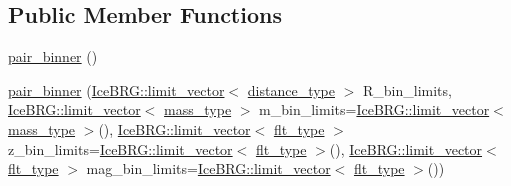 \subsection*{Public Member Functions}
\begin{DoxyCompactItemize}
\item 
\hyperlink{classIceBRG_1_1pair__binner_a14fe5215ad45872e549c71ecc4e170e9}{pair\+\_\+binner} ()
\item 
\hyperlink{classIceBRG_1_1pair__binner_aa63e9ed393f3571585112990a36e58d1}{pair\+\_\+binner} (\hyperlink{classIceBRG_1_1limit__vector}{Ice\+B\+R\+G\+::limit\+\_\+vector}$<$ \hyperlink{namespaceIceBRG_a45499647eb87e24c10ab32c628711cec}{distance\+\_\+type} $>$ R\+\_\+bin\+\_\+limits, \hyperlink{classIceBRG_1_1limit__vector}{Ice\+B\+R\+G\+::limit\+\_\+vector}$<$ \hyperlink{namespaceIceBRG_a1be72ac4918a9b029f2eefa084213e35}{mass\+\_\+type} $>$ m\+\_\+bin\+\_\+limits=\hyperlink{classIceBRG_1_1limit__vector}{Ice\+B\+R\+G\+::limit\+\_\+vector}$<$ \hyperlink{namespaceIceBRG_a1be72ac4918a9b029f2eefa084213e35}{mass\+\_\+type} $>$(), \hyperlink{classIceBRG_1_1limit__vector}{Ice\+B\+R\+G\+::limit\+\_\+vector}$<$ \hyperlink{lib_2IceBRG__main_2common_8h_ad0f130a56eeb944d9ef2692ee881ecc4}{flt\+\_\+type} $>$ z\+\_\+bin\+\_\+limits=\hyperlink{classIceBRG_1_1limit__vector}{Ice\+B\+R\+G\+::limit\+\_\+vector}$<$ \hyperlink{lib_2IceBRG__main_2common_8h_ad0f130a56eeb944d9ef2692ee881ecc4}{flt\+\_\+type} $>$(), \hyperlink{classIceBRG_1_1limit__vector}{Ice\+B\+R\+G\+::limit\+\_\+vector}$<$ \hyperlink{lib_2IceBRG__main_2common_8h_ad0f130a56eeb944d9ef2692ee881ecc4}{flt\+\_\+type} $>$ mag\+\_\+bin\+\_\+limits=\hyperlink{classIceBRG_1_1limit__vector}{Ice\+B\+R\+G\+::limit\+\_\+vector}$<$ \hyperlink{lib_2IceBRG__main_2common_8h_ad0f130a56eeb944d9ef2692ee881ecc4}{flt\+\_\+type} $>$())
\item 

\end{DoxyCompactItemize}
